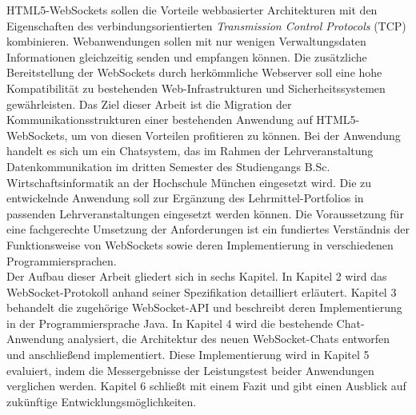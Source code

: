 \documentclass[11pt,a4paper,titlepage]{scrartcl}
\numberwithin{equation}{section}
\begin{document}
\noindent HTML5-WebSockets sollen die Vorteile webbasierter Architekturen mit den Eigenschaften des verbindungsorientierten \textit{Transmission Control Protocols} (TCP) kombinieren. Webanwendungen sollen mit nur wenigen Verwaltungsdaten Informationen gleichzeitig senden und empfangen können. Die zusätzliche Bereitstellung der WebSockets durch herkömmliche Webserver soll eine hohe Kompatibilität zu bestehenden Web-Infrastrukturen und Sicherheitssystemen gewährleisten. Das Ziel dieser Arbeit ist die Migration der Kommunikationsstrukturen einer bestehenden Anwendung auf HTML5-WebSockets, um von diesen Vorteilen profitieren zu können. Bei der Anwendung handelt es sich um ein Chatsystem, das im Rahmen der Lehrveranstaltung \glq Datenkommunikation\grq{} im dritten Semester des Studiengangs B.Sc. Wirtschaftsinformatik an der Hochschule München eingesetzt wird. Die zu entwickelnde Anwendung soll zur Ergänzung des Lehrmittel-Portfolios in passenden Lehrveranstaltungen eingesetzt werden können. Die Voraussetzung für eine fachgerechte Umsetzung der Anforderungen ist ein fundiertes Verständnis der Funktionsweise von WebSockets sowie deren Implementierung in verschiedenen Programmiersprachen.\\

\noindent Der Aufbau dieser Arbeit gliedert sich in sechs Kapitel. In Kapitel 2 wird das WebSocket-Protokoll anhand seiner Spezifikation detailliert erläutert. Kapitel 3 behandelt die zugehörige WebSocket-API und beschreibt deren Implementierung in der Programmiersprache Java. In Kapitel 4 wird die bestehende Chat-Anwendung analysiert, die Architektur des neuen WebSocket-Chats entworfen und anschließend implementiert. Diese Implementierung wird in Kapitel 5 evaluiert, indem die Messergebnisse der Leistungstest beider Anwendungen verglichen werden. Kapitel 6 schließt mit einem Fazit und gibt einen Ausblick auf zukünftige Entwicklungsmöglichkeiten.

\newpage
\end{document}
